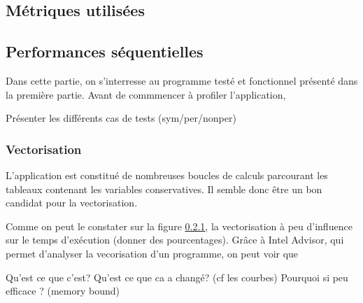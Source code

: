 \subsection{Métriques utilisées}


\subsection{Performances séquentielles}
Dans cette partie, on s'interresse au programme testé et fonctionnel présenté dans la première partie. Avant de commmencer à profiler l'application, 

Présenter les différents cas de tests (sym/per/nonper)

\subsubsection{Vectorisation}
L'application est constitué de nombreuses boucles de calculs parcourant les tableaux contenant les variables conservatives. Il semble donc être un bon candidat pour la vectorisation.

Comme on peut le constater sur la figure \ref{}, la vectorisation à peu d'influence sur le temps d'exécution (donner des pourcentages). Grâce à Intel Advisor, qui permet d'analyser la vecorisation d'un programme, on peut voir que 




Qu'est ce que c'est?
Qu'est ce que ca a changé? (cf les courbes)
Pourquoi si peu efficace ? (memory bound)


